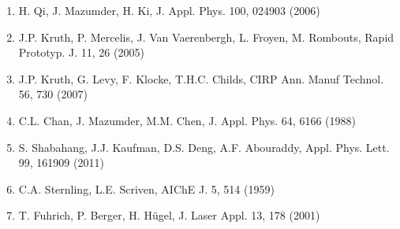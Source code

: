 \documentclass[10pt]{article}
\begin{document}
\begin{enumerate}
  \item H. Qi, J. Mazumder, H. Ki, J. Appl. Phys. 100, 024903 (2006)

  \item J.P. Kruth, P. Mercelis, J. Van Vaerenbergh, L. Froyen, M. Rombouts, Rapid Prototyp. J. 11, 26 (2005)

  \item J.P. Kruth, G. Levy, F. Klocke, T.H.C. Childs, CIRP Ann. Manuf Technol. 56, 730 (2007)

  \item C.L. Chan, J. Mazumder, M.M. Chen, J. Appl. Phys. 64, 6166 (1988)

  \item S. Shabahang, J.J. Kaufman, D.S. Deng, A.F. Abouraddy, Appl. Phys. Lett. 99, 161909 (2011)

  \item C.A. Sternling, L.E. Scriven, AIChE J. 5, 514 (1959)

  \item T. Fuhrich, P. Berger, H. Hügel, J. Laser Appl. 13, 178 (2001)

\end{enumerate}
\end{document}
